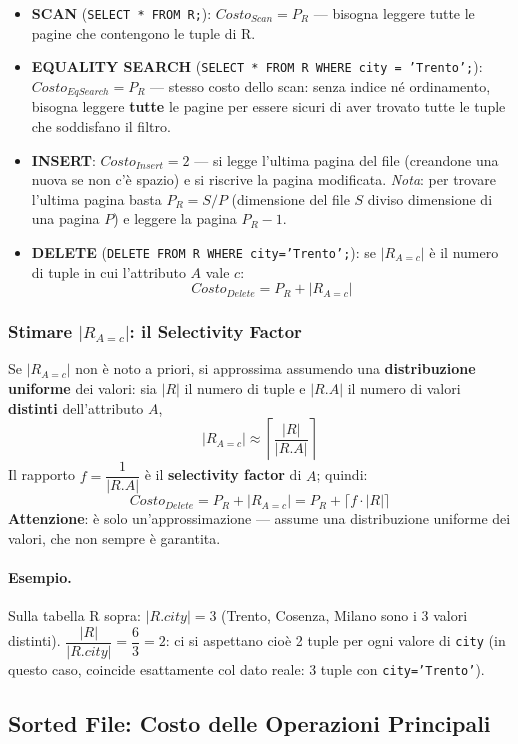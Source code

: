 \documentclass[12pt, a4paper]{article}
\begin{document}
\begin{itemize}
    \item \textbf{SCAN} (\texttt{SELECT * FROM R;}): $Costo_{Scan} = P_R$ — bisogna leggere tutte le pagine che contengono le tuple di R.
    \item \textbf{EQUALITY SEARCH} (\texttt{SELECT * FROM R WHERE city = 'Trento';}): $Costo_{EqSearch} = P_R$ — stesso costo dello scan: senza indice né ordinamento, bisogna leggere \textbf{tutte} le pagine per essere sicuri di aver trovato tutte le tuple che soddisfano il filtro.
    \item \textbf{INSERT}: $Costo_{Insert} = 2$ — si legge l'ultima pagina del file (creandone una nuova se non c'è spazio) e si riscrive la pagina modificata. \textit{Nota}: per trovare l'ultima pagina basta $P_R = S/P$ (dimensione del file $S$ diviso dimensione di una pagina $P$) e leggere la pagina $P_R{-}1$.
    \item \textbf{DELETE} (\texttt{DELETE FROM R WHERE city='Trento';}): se $|R_{A=c}|$ è il numero di tuple in cui l'attributo $A$ vale $c$:
    $$Costo_{Delete} = P_R + |R_{A=c}|$$
\end{itemize}

\subsubsection{Stimare $|R_{A=c}|$: il Selectivity Factor}
Se $|R_{A=c}|$ non è noto a priori, si approssima assumendo una \textbf{distribuzione uniforme} dei valori: sia $|R|$ il numero di tuple e $|R.A|$ il numero di valori \textbf{distinti} dell'attributo $A$,
$$|R_{A=c}| \approx \left\lceil \frac{|R|}{|R.A|} \right\rceil$$
Il rapporto $f = \dfrac{1}{|R.A|}$ è il \textbf{selectivity factor} di $A$; quindi:
$$Costo_{Delete} = P_R + |R_{A=c}| = P_R + \lceil f \cdot |R| \rceil$$
\textbf{Attenzione}: è solo un'approssimazione — assume una distribuzione uniforme dei valori, che non sempre è garantita.

\paragraph{Esempio.} Sulla tabella R sopra: $|R.city| = 3$ (Trento, Cosenza, Milano sono i 3 valori distinti). $\dfrac{|R|}{|R.city|} = \dfrac{6}{3} = 2$: ci si aspettano cioè 2 tuple per ogni valore di \texttt{city} (in questo caso, coincide esattamente col dato reale: 3 tuple con \texttt{city='Trento'}).

\subsection{Sorted File: Costo delle Operazioni Principali}
\end{document}
